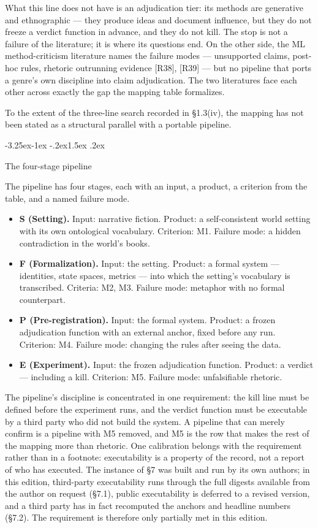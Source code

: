 \documentclass[11pt,a4paper]{article}
\makeatletter
\renewcommand\subsection{\@startsection{subsection}{2}{\z@}%
  {-3.25ex\@plus -1ex \@minus -.2ex}{1.5ex \@plus .2ex}%
  {\normalfont\large\bfseries\raggedright}}
\makeatother
\begin{document}
What this line does not have is an adjudication tier: its methods are generative and ethnographic — they produce ideas and document influence, but they do not freeze a verdict function in advance, and they do not kill. The stop is not a failure of the literature; it is where its questions end. On the other side, the ML method-criticism literature names the failure modes — unsupported claims, post-hoc rules, rhetoric outrunning evidence [R38], [R39] — but no pipeline that ports a genre's own discipline into claim adjudication. The two literatures face each other across exactly the gap the mapping table formalizes.

To the extent of the three-line search recorded in §1.3(iv), the mapping has not been stated as a structural parallel with a portable pipeline.

\subsection{The four-stage pipeline}

The pipeline has four stages, each with an input, a product, a criterion from the table, and a named failure mode.

\begin{itemize}[leftmargin=1.6em,itemsep=2pt,parsep=0pt,topsep=3pt]
\item \textbf{S (Setting).} Input: narrative fiction. Product: a self-consistent world setting with its own ontological vocabulary. Criterion: M1. Failure mode: a hidden contradiction in the world's books.
\item \textbf{F (Formalization).} Input: the setting. Product: a formal system — identities, state spaces, metrics — into which the setting's vocabulary is transcribed. Criteria: M2, M3. Failure mode: metaphor with no formal counterpart.
\item \textbf{P (Pre-registration).} Input: the formal system. Product: a frozen adjudication function with an external anchor, fixed before any run. Criterion: M4. Failure mode: changing the rules after seeing the data.
\item \textbf{E (Experiment).} Input: the frozen adjudication function. Product: a verdict — including a kill. Criterion: M5. Failure mode: unfalsifiable rhetoric.
\end{itemize}

The pipeline's discipline is concentrated in one requirement: the kill line must be defined before the experiment runs, and the verdict function must be executable by a third party who did not build the system. A pipeline that can merely confirm is a pipeline with M5 removed, and M5 is the row that makes the rest of the mapping more than rhetoric. One calibration belongs with the requirement rather than in a footnote: executability is a property of the record, not a report of who has executed. The instance of §7 was built and run by its own authors; in this edition, third-party executability runs through the full digests available from the author on request (§7.1), public executability is deferred to a revised version, and a third party has in fact recomputed the anchors and headline numbers (§7.2). The requirement is therefore only partially met in this edition.
\end{document}
